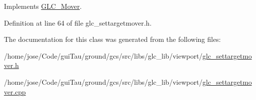 Implements \hyperlink{class_g_l_c___mover_a50797471a7a71612eef7d80f509f8a74}{G\-L\-C\-\_\-\-Mover}.



Definition at line 64 of file glc\-\_\-settargetmover.\-h.



The documentation for this class was generated from the following files\-:\begin{DoxyCompactItemize}
\item 
/home/jose/\-Code/gui\-Tau/ground/gcs/src/libs/glc\-\_\-lib/viewport/\hyperlink{glc__settargetmover_8h}{glc\-\_\-settargetmover.\-h}\item 
/home/jose/\-Code/gui\-Tau/ground/gcs/src/libs/glc\-\_\-lib/viewport/\hyperlink{glc__settargetmover_8cpp}{glc\-\_\-settargetmover.\-cpp}\end{DoxyCompactItemize}
